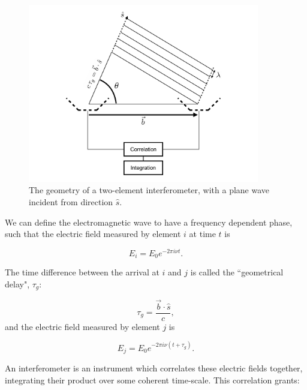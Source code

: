 \begin{figure}
\centering
\includegraphics[width=0.9\textwidth]{chapters/interferometry/figures/visibility_explanation.pdf}
\caption{The geometry of a two-element interferometer, with a plane wave incident from direction $\hat{s}$.}
\label{fig:interferometry_2element}
\end{figure}

We can define the electromagnetic wave to have a frequency dependent phase, such that the electric field measured by element $i$ at time $t$ is

\begin{equation}
E_i = E_0 e^{-2\pi i \nu t}.
\label{eq:Ei}
\end{equation}

The time difference between the arrival at $i$ and $j$ is called the ``geometrical delay", $\tau_g$:

\begin{equation}
\tau_g = \frac{\vec{b}\cdot\hat{s}}{c},
\end{equation}
and the electric field measured by element $j$ is

\begin{equation}
E_j = E_0 e^{-2\pi i \nu (t+\tau_g)}.
\end{equation}

An interferometer is an instrument which correlates these electric fields together, integrating their product over some coherent time-scale. This correlation grants:


